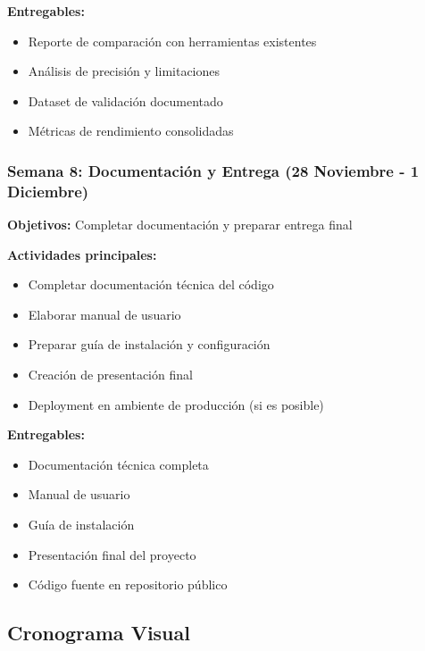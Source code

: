 \textbf{Entregables:}
\begin{itemize}
    \item Reporte de comparación con herramientas existentes
    \item Análisis de precisión y limitaciones
    \item Dataset de validación documentado
    \item Métricas de rendimiento consolidadas
\end{itemize}

\subsubsection{Semana 8: Documentación y Entrega (28 Noviembre - 1 Diciembre)}
\textbf{Objetivos:} Completar documentación y preparar entrega final

\textbf{Actividades principales:}
\begin{itemize}
    \item Completar documentación técnica del código
    \item Elaborar manual de usuario
    \item Preparar guía de instalación y configuración
    \item Creación de presentación final
    \item Deployment en ambiente de producción (si es posible)
\end{itemize}

\textbf{Entregables:}
\begin{itemize}
    \item Documentación técnica completa
    \item Manual de usuario
    \item Guía de instalación
    \item Presentación final del proyecto
    \item Código fuente en repositorio público
\end{itemize}

\subsection{Cronograma Visual}

